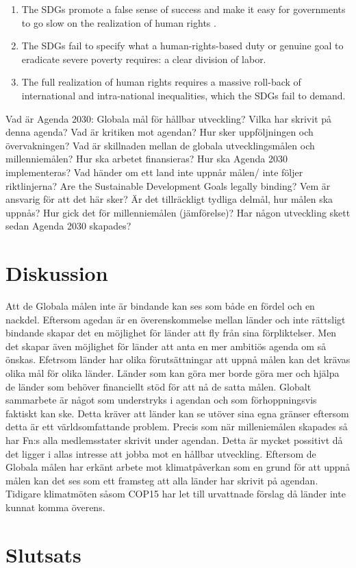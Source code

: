 \documentclass{report}
\begin{document}
\begin{enumerate}
\item The SDGs promote a false sense of success and make it easy for governments to go slow on the realization of human rights .
\item The SDGs fail to specify what a human-rights-based duty or genuine goal to eradicate severe poverty requires: a clear division of labor.
\item The full realization of human rights requires a massive roll-back of international and intra-national inequalities, which the SDGs fail to demand.
\end{enumerate} 



Vad är Agenda 2030: Globala mål för hållbar utveckling? 
Vilka har skrivit på denna agenda?
Vad är kritiken mot agendan? 
Hur sker uppföljningen och övervakningen?
Vad är skillnaden mellan de globala utvecklingsmålen och millenniemålen?
Hur ska arbetet finansieras?
Hur ska Agenda 2030 implementeras? 
Vad händer om ett land inte uppnår målen/ inte följer riktlinjerna? 
Are the Sustainable Development Goals legally binding? 
Vem är ansvarig för att det här sker?
Är det tillräckligt tydliga delmål, hur målen ska uppnås?
Hur gick det för millenniemålen (jämförelse)? 
Har någon utveckling skett sedan Agenda 2030 skapades?



\newpage
\section{Diskussion}
Att de Globala målen inte är bindande kan ses som både en fördel och en nackdel. Eftersom agedan är en överenskommelse mellan länder och inte rättsligt bindande skapar det en möjlighet för länder att fly från sina förpliktelser. Men det skapar även möjlighet för länder att anta en mer ambitiös agenda om så önskas. \cite{critique} Efetrsom länder har olika förutsättningar att uppnå målen kan det krävas olika mål för olika länder. Länder som kan göra mer borde göra mer och hjälpa de länder som behöver financiellt stöd för att nå de satta målen. Globalt sammarbete är något som understryks i agendan och som förhoppningsvis faktiskt kan ske. Detta kräver att länder kan se utöver sina egna gränser eftersom detta är ett världsomfattande problem. Precis som när milleniemålen skapades så har Fn:s alla medlemsstater skrivit under agendan. Detta är mycket possitivt då det ligger i allas intresse att jobba mot en hållbar utveckling. Eftersom de Globala målen har erkänt arbete mot klimatpåverkan som en grund för att uppnå målen kan det ses som ett framsteg att alla länder har skrivit på agendan. Tidigare klimatmöten såsom COP15 har let till urvattnade förslag då länder inte kunnat komma överens. 


\newpage
\section{Slutsats}

 
\end{document}
